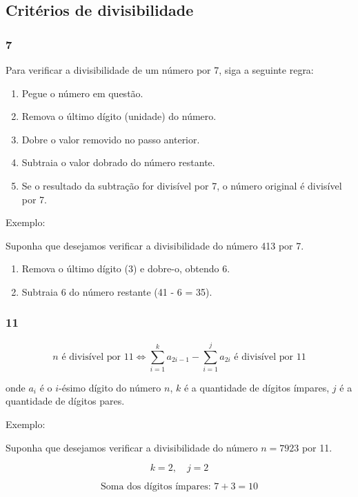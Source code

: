 
\subsection{Critérios de divisibilidade}

\subsubsection{7}

Para verificar a divisibilidade de um número por 7, siga a seguinte regra:

\begin{enumerate}
  \item Pegue o número em questão.
  \item Remova o último dígito (unidade) do número.
  \item Dobre o valor removido no passo anterior.
  \item Subtraia o valor dobrado do número restante.
  \item Se o resultado da subtração for divisível por 7, o número original é divisível por 7.
\end{enumerate}

Exemplo:

Suponha que desejamos verificar a divisibilidade do número 413 por 7.

\begin{enumerate}
  \item Remova o último dígito (3) e dobre-o, obtendo 6.
  \item Subtraia 6 do número restante (41 - 6 = 35).
\end{enumerate}

\subsubsection{11}

\[
n \text{ é divisível por 11} \iff \sum_{i=1}^{k} a_{2i-1} - \sum_{i=1}^{j} a_{2i} \text{ é divisível por 11}
\]

onde \(a_{i}\) é o \(i\)-ésimo dígito do número \(n\), \(k\) é a quantidade de dígitos ímpares, \(j\) é a quantidade de dígitos pares.

Exemplo:

Suponha que desejamos verificar a divisibilidade do número \(n = 7923\) por 11.

\[
k = 2, \quad j = 2
\]

\[
\text{Soma dos dígitos ímpares: } 7 + 3 = 10
\]

